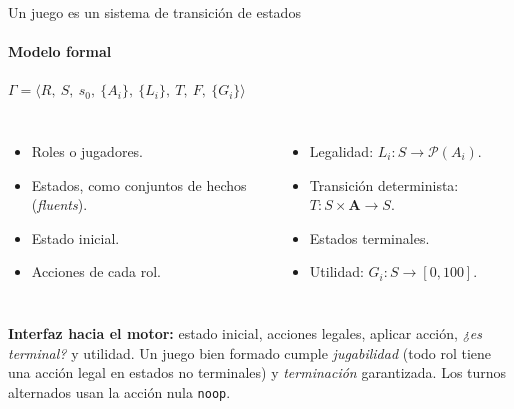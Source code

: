 \documentclass[aspectratio=169,10pt,t]{beamer}
\begin{document}
\begin{frame}{Un juego es un sistema de transición de estados}
\framesubtitle{Modelo formal}
\begin{banda}[vinooscuro]
\centering\Large $\Gamma=\langle R,\ S,\ s_0,\ \{A_i\},\ \{L_i\},\ T,\ F,\ \{G_i\}\rangle$
\end{banda}
\vspace{2pt}
\begin{columns}[T]
\small
\begin{itemize}\setlength\itemsep{2pt}
\item[$R$] Roles o jugadores.
\item[$S$] Estados, como conjuntos de hechos (\emph{fluents}).
\item[$s_0$] Estado inicial.
\item[$A_i$] Acciones de cada rol.
\end{itemize}
\small
\begin{itemize}\setlength\itemsep{2pt}
\item[$L_i$] Legalidad: $L_i:S\to\mathcal{P}(A_i)$.
\item[$T$] Transición determinista: $T:S\times\mathbf{A}\to S$.
\item[$F$] Estados terminales.
\item[$G_i$] Utilidad: $G_i:S\to[0,100]$.
\end{itemize}
\end{columns}
\vspace{4pt}
\begin{tarjeta}[azulp]
\footnotesize
\textbf{Interfaz hacia el motor:} estado inicial, acciones legales, aplicar acción, \emph{¿es terminal?} y utilidad. Un juego bien formado cumple \emph{jugabilidad} (todo rol tiene una acción legal en estados no terminales) y \emph{terminación} garantizada. Los turnos alternados usan la acción nula \texttt{noop}.
\end{tarjeta}
\end{frame}
\end{document}
